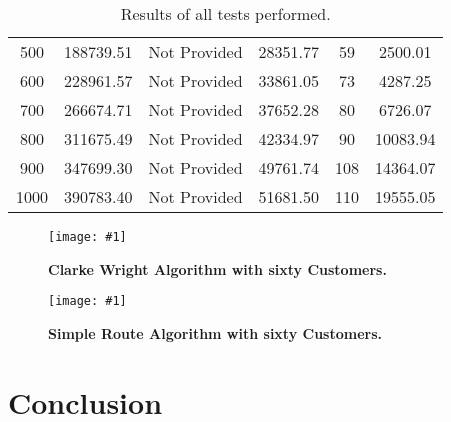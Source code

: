 \documentclass[conference]{acmsiggraph}
\newcommand{\figuremacroW}[4]{
	\begin{figure}[h] %
		\centering
		\texttt{[image: \#1]}
		\caption[#2]{\textbf{#2}  #3}
		\label{fig:#1}
	\end{figure}
}
\begin{document}
\begin{table}[h]
{{\begin{minipage}{\textwidth}
\begin{tabular}{cccccc}
			500                 & 188739.51            & Not Provided       & 28351.77          & 59              & 2500.01             \\
			600                 & 228961.57            & Not Provided       & 33861.05          & 73              & 4287.25             \\
			700                 & 266674.71            & Not Provided       & 37652.28          & 80              & 6726.07             \\
			800                 & 311675.49            & Not Provided       & 42334.97          & 90              & 10083.94            \\
			900                 & 347699.30            & Not Provided       & 49761.74          & 108             & 14364.07            \\
			1000                & 390783.40            & Not Provided       & 51681.50          & 110             & 19555.05           
		\end{tabular}
		\caption[Table caption text]{Results of all tests performed.}
		\label{table:name}
		\end{minipage}}
	}
	\end{table}
	\clearpage
	
	\figuremacroW
	{cw60}
	{Clarke Wright Algorithm with sixty Customers.}
	{}
	{0.75}
	
	\figuremacroW
	{sr60}
	{Simple Route Algorithm with sixty Customers.}
	{}
	{0.75}	

	\section{Conclusion}
\end{document}
